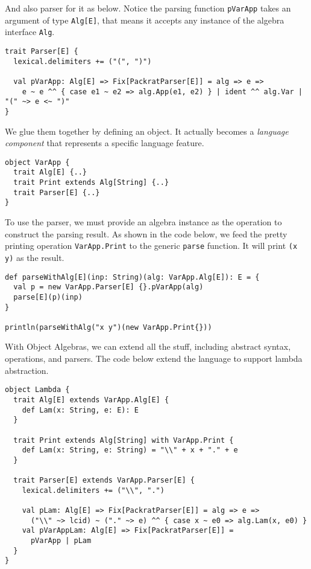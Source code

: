 And also parser for it as below. Notice the parsing function \lstinline{pVarApp} takes an argument of type \lstinline{Alg[E]}, that means it accepts any instance of the algebra interface \lstinline{Alg}.

\begin{lstlisting}
trait Parser[E] {
  lexical.delimiters += ("(", ")")

  val pVarApp: Alg[E] => Fix[PackratParser[E]] = alg => e =>
    e ~ e ^^ { case e1 ~ e2 => alg.App(e1, e2) } | ident ^^ alg.Var | "(" ~> e <~ ")"
}
\end{lstlisting}

We glue them together by defining an object. It actually becomes a \textit{language component} that represents a specific language feature.

\begin{lstlisting}
object VarApp {
  trait Alg[E] {..}
  trait Print extends Alg[String] {..}
  trait Parser[E] {..}
}
\end{lstlisting}

To use the parser, we must provide an algebra instance as the operation to construct the parsing result. As shown in the code below, we feed the pretty printing operation \lstinline{VarApp.Print} to the generic \lstinline{parse} function. It will print \lstinline{(x y)} as the result.

\begin{lstlisting}
def parseWithAlg[E](inp: String)(alg: VarApp.Alg[E]): E = {
  val p = new VarApp.Parser[E] {}.pVarApp(alg)
  parse[E](p)(inp)
}

println(parseWithAlg("x y")(new VarApp.Print{}))
\end{lstlisting}

With Object Algebras, we can extend all the stuff, including abstract syntax, operations, and parsers. The code below extend the language to support lambda abstraction.

\begin{lstlisting}
object Lambda {
  trait Alg[E] extends VarApp.Alg[E] {
    def Lam(x: String, e: E): E
  }

  trait Print extends Alg[String] with VarApp.Print {
    def Lam(x: String, e: String) = "\\" + x + "." + e
  }

  trait Parser[E] extends VarApp.Parser[E] {
    lexical.delimiters += ("\\", ".")

    val pLam: Alg[E] => Fix[PackratParser[E]] = alg => e =>
      ("\\" ~> lcid) ~ ("." ~> e) ^^ { case x ~ e0 => alg.Lam(x, e0) }
    val pVarAppLam: Alg[E] => Fix[PackratParser[E]] =
      pVarApp | pLam
  }
}
\end{lstlisting}

